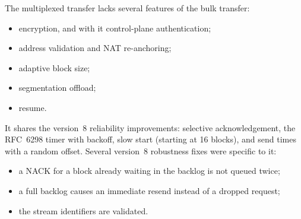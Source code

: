 The multiplexed transfer lacks several features of the bulk transfer:
\begin{itemize}
  \item encryption, and with it control-plane authentication;
  \item address validation and NAT re-anchoring;
  \item adaptive block size;
  \item segmentation offload;
  \item resume.
\end{itemize}
It shares the version~8 reliability improvements: selective acknowledgement, the RFC~6298 timer with backoff,
slow start (starting at 16 blocks), and send times with a random offset. Several version~8 robustness fixes were
specific to it:
\begin{itemize}
  \item a NACK for a block already waiting in the backlog is not queued twice;
  \item a full backlog causes an immediate resend instead of a dropped request;
  \item the stream identifiers are validated.
\end{itemize}
